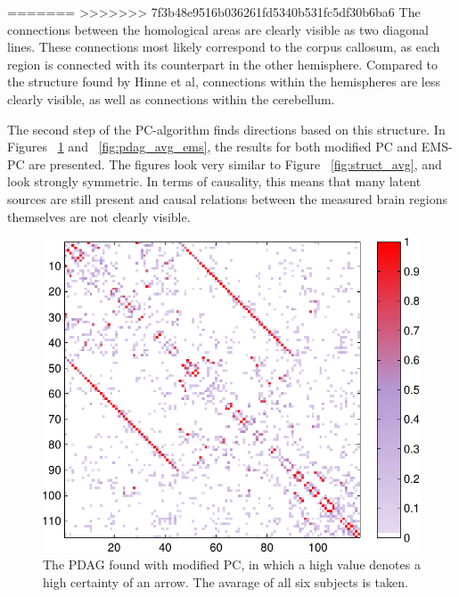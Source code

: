 \documentclass[a4paper, 10pt, english, onecolumn]{article}
\begin{document}
=======
>>>>>>> 7f3b48e9516b036261fd5340b531fc5df30b6ba6
The connections between the homological areas are clearly visible as two diagonal lines.
These connections most likely correspond to the corpus callosum, as each region is connected with its counterpart in the other hemisphere.
Compared to the structure found by Hinne et al, connections within the hemispheres are less clearly visible, as well as connections within the cerebellum.

The second step of the PC-algorithm finds directions based on this structure.
In Figures ~\ref{fig:pdag_avg_mod} and ~\ref{fig:pdag_avg_ems}, the results for both modified PC and EMS-PC are presented.
The figures look very similar to Figure ~\ref{fig:struct_avg}, and look strongly symmetric.
In terms of causality, this means that many latent sources are still present and causal relations between the measured brain regions themselves are not clearly visible.

\begin{figure}[h!]
  \centering
  \includegraphics{images/pdag_avg_colored_mod}
  \caption{The PDAG found with modified PC, in which a high value denotes a high certainty of an arrow. The avarage of all six subjects is taken.}
  \label{fig:pdag_avg_mod}
\end{figure}
\end{document}
